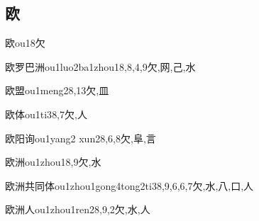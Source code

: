 \subsection*{欧}

\begin{EntryWithPhonetic}{欧}{ou1}{8}{⽋}
\end{EntryWithPhonetic}

\begin{EntryWithPhonetic}{欧罗巴洲}{ou1luo2ba1zhou1}{8,8,4,9}{⽋,⽹,⼰,⽔}
\end{EntryWithPhonetic}

\begin{EntryWithPhonetic}{欧盟}{ou1meng2}{8,13}{⽋,⽫}
\end{EntryWithPhonetic}

\begin{EntryWithPhonetic}{欧体}{ou1ti3}{8,7}{⽋,⼈}
\end{EntryWithPhonetic}

\begin{EntryWithPhonetic}{欧阳询}{ou1yang2 xun2}{8,6,8}{⽋,⾩,⾔}
\end{EntryWithPhonetic}

\begin{EntryWithPhonetic}{欧洲}{ou1zhou1}{8,9}{⽋,⽔}
\end{EntryWithPhonetic}

\begin{EntryWithPhonetic}{欧洲共同体}{ou1zhou1gong4tong2ti3}{8,9,6,6,7}{⽋,⽔,⼋,⼝,⼈}
\end{EntryWithPhonetic}

\begin{EntryWithPhonetic}{欧洲人}{ou1zhou1ren2}{8,9,2}{⽋,⽔,⼈}
\end{EntryWithPhonetic}

